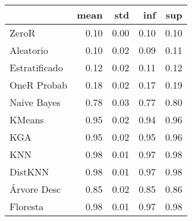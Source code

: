 \begin{table}
\centering
\label{Digits_status_table}
\begin{tabular}{lrrrr}
\toprule
{} &  mean &  std &  inf &  sup \\
\midrule
ZeroR         &  0.10 & 0.00 & 0.10 & 0.10 \\
Aleatorio     &  0.10 & 0.02 & 0.09 & 0.11 \\
Estratificado &  0.12 & 0.02 & 0.11 & 0.12 \\
OneR Probab   &  0.18 & 0.02 & 0.17 & 0.19 \\
Naive Bayes   &  0.78 & 0.03 & 0.77 & 0.80 \\
KMeans        &  0.95 & 0.02 & 0.94 & 0.96 \\
KGA           &  0.95 & 0.02 & 0.95 & 0.96 \\
KNN           &  0.98 & 0.01 & 0.97 & 0.98 \\
DistKNN       &  0.98 & 0.01 & 0.97 & 0.98 \\
Árvore Desc   &  0.85 & 0.02 & 0.85 & 0.86 \\
Floresta      &  0.98 & 0.01 & 0.97 & 0.98 \\
\bottomrule
\end{tabular}
\end{table}

